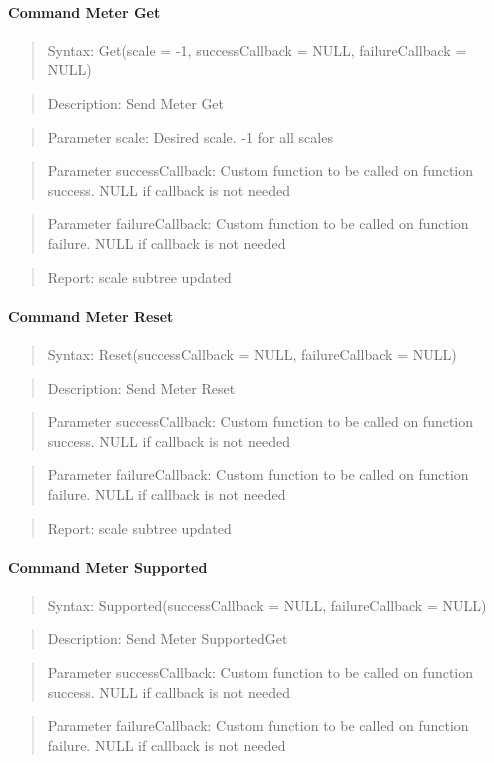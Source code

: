 \paragraph{Command Meter Get}
\begin{quote}Syntax: Get(scale = -1, successCallback = NULL, failureCallback = NULL)\end{quote}
\begin{quote}Description: Send Meter Get\end{quote}
\begin{quote}Parameter scale: Desired scale. -1 for all scales\end{quote}
\begin{quote}Parameter successCallback: Custom function to be called on function success. NULL if callback is not needed\end{quote}
\begin{quote}Parameter failureCallback: Custom function to be called on function failure. NULL if callback is not needed\end{quote}
\begin{quote}Report: scale subtree updated\end{quote}

\paragraph{Command Meter Reset}
\begin{quote}Syntax: Reset(successCallback = NULL, failureCallback = NULL)\end{quote}
\begin{quote}Description: Send Meter Reset\end{quote}
\begin{quote}Parameter successCallback: Custom function to be called on function success. NULL if callback is not needed\end{quote}
\begin{quote}Parameter failureCallback: Custom function to be called on function failure. NULL if callback is not needed\end{quote}
\begin{quote}Report: scale subtree updated\end{quote}

\paragraph{Command Meter Supported}
\begin{quote}Syntax: Supported(successCallback = NULL, failureCallback = NULL)\end{quote}
\begin{quote}Description: Send Meter SupportedGet\end{quote}
\begin{quote}Parameter successCallback: Custom function to be called on function success. NULL if callback is not needed\end{quote}
\begin{quote}Parameter failureCallback: Custom function to be called on function failure. NULL if callback is not needed\end{quote}



